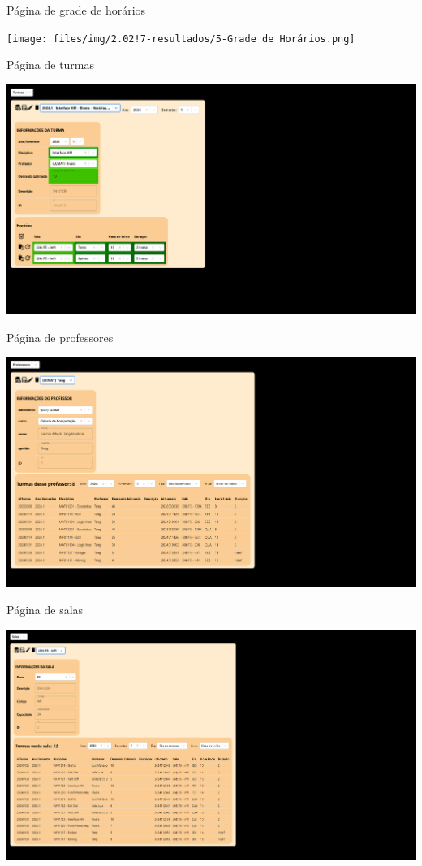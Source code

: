 \begin{MyCenteredFigure} \caption{Página de grade de horários} \label{fig:grade}
  \texttt{[image: files/img/2.02!7-resultados/5-Grade de Horários.png]}
\end{MyCenteredFigure}

\begin{MyCenteredFigure} \caption{Página de turmas} \label{fig:turmas}
  \includegraphics[width=\textwidth]{files/img/2.02!7-resultados/6-Turmas.png}
\end{MyCenteredFigure}

\begin{MyCenteredFigure} \caption{Página de professores} \label{fig:professores}
  \includegraphics[width=\textwidth]{files/img/2.02!7-resultados/7-Professores.png}
\end{MyCenteredFigure}

\begin{MyCenteredFigure} \caption{Página de salas} \label{fig:salas}
  \includegraphics[width=\textwidth]{files/img/2.02!7-resultados/8-Salas.png}
\end{MyCenteredFigure}

